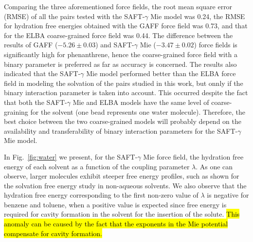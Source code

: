 \documentclass[final,12p,times,twocolumn]{elsarticle}
\begin{document}
	Comparing the three aforementioned force fields, the root mean square error (RMSE) of all the pairs tested with the SAFT-$\gamma$ Mie model was 0.24, the RMSE for hydration free energies obtained with the GAFF force field was 0.73, and that for the ELBA coarse-grained force field was 0.44. The difference between the results of GAFF ($-5.26 \pm 0.03$) and SAFT-$\gamma$ Mie ($-3.47 \pm 0.02$) force fields is significantly high for phenanthrene, hence the coarse-grained force field with a binary parameter is preferred as far as accuracy is concerned.
	The results also indicated that the SAFT-$\gamma$ Mie model performed better than the ELBA force field in modeling the solvation of the pairs studied in this work, but onnly if the binary interaction parameter is taken into account. This occurred despite the fact that both the SAFT-$\gamma$ Mie and ELBA models have the same level of coarse-graining for the solvent (one bead represents one water molecule). Therefore, the best choice between the two coarse-grained models will probably depend on the availability and transferability of binary interaction parameters for the SAFT-$\gamma$ Mie model.
	
	In Fig.~\ref{fig:water} we present, for the SAFT-$\gamma$ Mie force field, the hydration free energy of each solvent as a function of the coupling parameter $\lambda$. As one can observe, larger molecules exhibit steeper free energy profiles, such as shown for the solvation free energy study in non-aqueous solvents. We also observe that the hydration free energy corresponding to the first non-zero value of $\lambda$ is negative for benzene and toluene, when a positive value is expected since free energy is required for cavity formation in the solvent for the insertion of the solute. \hl{This anomaly can be caused by the fact that the exponents in the Mie potential compensate for cavity formation.} 
\end{document}
